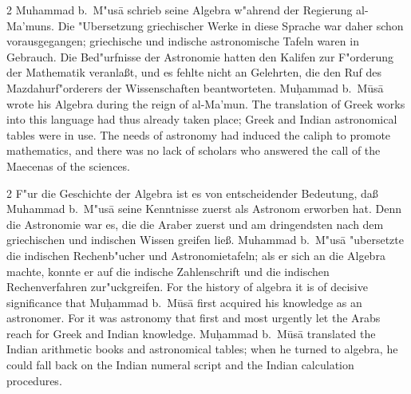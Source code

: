 \documentclass[10pt,a4paper]{article}
\renewcommand{\switchcolumn}{\syncronize\nointerlineskip\columnbreak}
\begin{document}
\begin{paracol}{2}
Muhammad b.\ M"us\=a schrieb seine Algebra w"ahrend der Regierung al-Ma'muns. Die "Ubersetzung griechischer Werke in diese Sprache war daher schon vorausgegangen; griechische und indische astronomische Tafeln waren in Gebrauch. Die Bed"urfnisse der Astronomie hatten den Kalifen zur F"orderung der Mathematik veranla\ss{}t, und es fehlte nicht an Gelehrten, die den Ruf des Mazdahurf"orderers der Wissenschaften beantworteten.
\switchcolumn
Mu\d{h}ammad b.\ M\=us\=a wrote his Algebra during the reign of al-Ma'mun. The translation of Greek works into this language had thus already taken place; Greek and Indian astronomical tables were in use. The needs of astronomy had induced the caliph to promote mathematics, and there was no lack of scholars who answered the call of the Maecenas of the sciences.
\end{paracol}

\begin{paracol}{2}
F"ur die Geschichte der Algebra ist es von entscheidender Bedeutung, da\ss{} Muhammad b.\ M"us\=a seine Kenntnisse zuerst als Astronom erworben hat. Denn die Astronomie war es, die die Araber zuerst und am dringendsten nach dem griechischen und indischen Wissen greifen lie\ss{}. Muhammad b.\ M"us\=a "ubersetzte die indischen Rechenb"ucher und Astronomietafeln; als er sich an die Algebra machte, konnte er auf die indische Zahlenschrift und die indischen Rechenverfahren zur"uckgreifen.
\switchcolumn
For the history of algebra it is of decisive significance that Mu\d{h}ammad b.\ M\=us\=a first acquired his knowledge as an astronomer. For it was astronomy that first and most urgently let the Arabs reach for Greek and Indian knowledge. Mu\d{h}ammad b.\ M\=us\=a translated the Indian arithmetic books and astronomical tables; when he turned to algebra, he could fall back on the Indian numeral script and the Indian calculation procedures.
\end{paracol}
\end{document}
